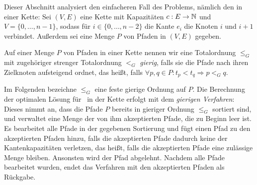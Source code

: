 Dieser Abschnitt analysiert den einfacheren Fall des Problems, nämlich den in einer Kette:
Sei $(V,E)$ eine Kette mit Kapazitäten $c: E \to \mathbb N$ und $V=\{0,\dots,n-1\}$, sodass für $i \in \{0,\dots,n-2\}$
die Kante $e_i$ die Knoten $i$ und $i+1$ verbindet.
Außerdem sei eine Menge $P$ von Pfaden in $(V,E)$ gegeben.
\begin{definition}
    Auf einer Menge $P$ von Pfaden in einer Kette nennen wir eine Totalordnung $\leq_G$ mit zugehöriger strenger Totalordnung
    $<_G$ {\em gierig},
    falls sie die Pfade nach ihren Zielknoten aufsteigend ordnet, das heißt, falls
    $\forall p, q \in P \colon t_p < t_q \Rightarrow p <_G q$.
\end{definition}
Im Folgenden bezeichne $\leq_G$ eine feste gierige Ordnung auf $P$.
Die Berechnung der optimalen Lösung für \CallControl\ in der Kette erfolgt mit dem {\em gierigen Verfahren}:
Dieses nimmt an, dass die Pfade $P$ bereits in gieriger Ordnung $\leq_G$ sortiert sind,
und verwaltet eine Menge der von ihm akzeptierten Pfade, die zu Beginn leer ist.
Es bearbeitet alle Pfade in der gegebenen Sortierung und fügt einen Pfad zu den akzeptierten Pfaden hinzu, falls die
akzeptierten Pfade dadurch keine der Kantenkapazitäten verletzen, das heißt, falls die akzeptierten Pfade eine zulässige Menge bleiben.
Ansonsten wird der Pfad abgelehnt.
Nachdem alle Pfade bearbeitet wurden, endet das Verfahren mit den akzeptierten Pfaden als Rückgabe.

